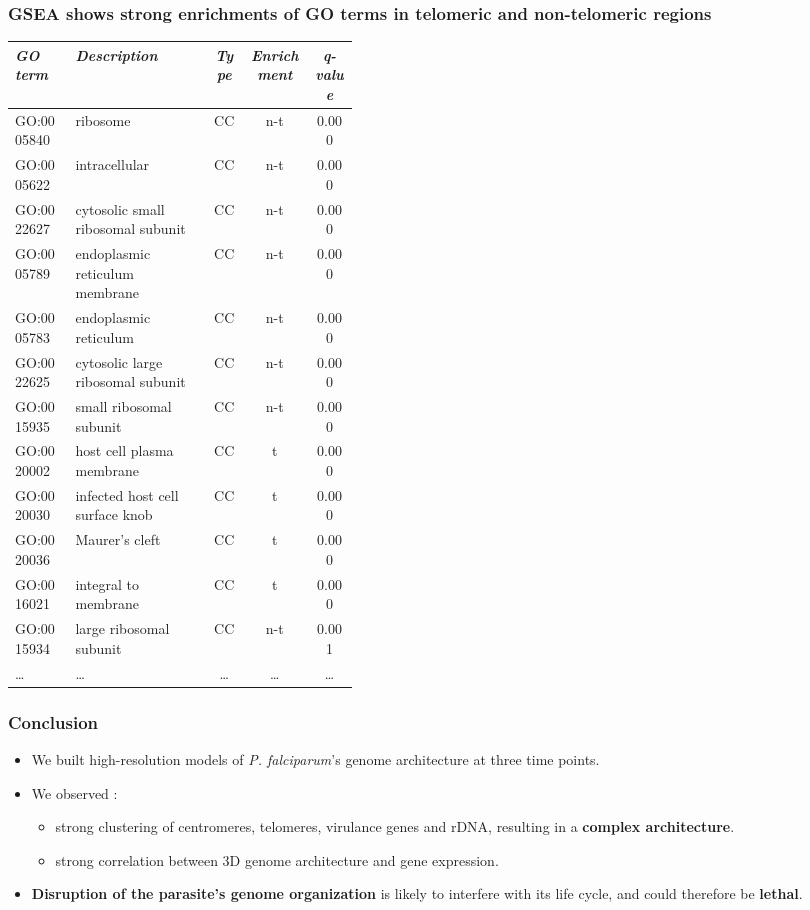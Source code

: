 \documentclass[xcolor=dvipsnames]{beamer}
\begin{document}
\begin{frame}
\frametitle{GSEA shows strong enrichments of GO terms in telomeric and
non-telomeric regions}

\begin{table}
\footnotesize
\vspace{10pt}
\begin{center}
\begin{tabular}{lp{0.4\linewidth}ccc}
\hline
\emph{GO term }&  \emph{Description} & \emph{Type} & \emph{Enrichment} &
\emph{q-value}  \\
\hline
GO:0005840 & ribosome & CC & n-t & 0.000\\
GO:0005622 & intracellular & CC & n-t & 0.000\\
GO:0022627 & cytosolic small ribosomal subunit & CC & n-t & 0.000\\
GO:0005789 & endoplasmic reticulum membrane & CC & n-t & 0.000\\
GO:0005783 & endoplasmic reticulum & CC & n-t & 0.000\\
GO:0022625 & cytosolic large ribosomal subunit & CC & n-t & 0.000\\
GO:0015935 & small ribosomal subunit & CC & n-t & 0.000\\
GO:0020002 & host cell plasma membrane & CC & t & 0.000\\
GO:0020030 & infected host cell surface knob & CC & t & 0.000\\
GO:0020036 & Maurer's cleft & CC & t & 0.000\\
GO:0016021 & integral to membrane & CC & t & 0.000\\
GO:0015934 & large ribosomal subunit & CC & n-t & 0.001\\
\dots & \dots & \dots & \dots & \dots \\
\end{tabular}
\end{center}
\end{table}
\end{frame}

\begin{frame}
\frametitle{Conclusion}
\begin{itemize}[label={$\bullet$}]
\item We built high-resolution models of {\em P. falciparum}'s genome
architecture at three time points.
\item We observed :
\begin{itemize}[label={$\bullet$}]
\item strong clustering of centromeres, telomeres, virulance genes
and rDNA, resulting in a {\bf complex architecture}.
\item strong correlation between 3D genome architecture and gene expression.
\end{itemize}
\item {\bf Disruption of the parasite's genome organization} is likely to
interfere with its life cycle, and could therefore be {\bf lethal}.
\end{itemize}

\end{frame}
\end{document}
